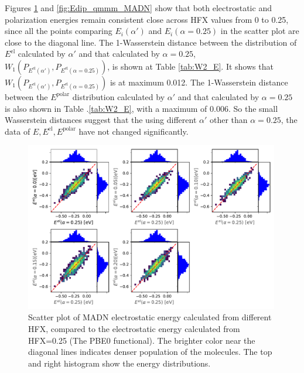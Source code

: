 \documentclass[letterpaper,12pt]{article}
\begin{document}
Figures \ref{fig:Estat_qmmm_MADN} and \ref{fig:Edip_qmmm_MADN} show that both electrostatic and polarization energies remain consistent close across HFX values from 0 to 0.25, since all the points comparing $E_i(\alpha')$ and $E_i(\alpha=0.25)$ in the scatter plot are close to the diagonal line.
The 1-Wasserstein distance between the distribution of $E^\text{el}$ calculated by $\alpha'$ and that calculated by $\alpha=0.25$, $W_1(P_{E^\text{el}(\alpha')}, P_{E^\text{el}(\alpha=0.25)})$, is shown at Table \ref{tab:W2_E}. It shows that $W_1(P_{E^\text{el}(\alpha')}, P_{E^\text{el}(\alpha=0.25)})$ is at maximum 0.012. The 1-Wasserstein distance between the $E^\text{polar}$ distribution calculated by $\alpha'$ and that calculated by $\alpha=0.25$ is also shown in Table .\ref{tab:W2_E}, with a maximum of 0.006. So the small Wasserstein distances suggest that the using different $\alpha'$ other than $\alpha=0.25$, the data of $E, E^\text{el}, E^\text{polar}$ have not changed significantly.

\begin{figure}[H]
    \centering
    \includegraphics[width=0.99\textwidth]{figs/scatterEstat_qmmm.pdf}
    \caption{Scatter plot of MADN electrostatic energy calculated from different HFX, compared to the electrostatic energy calculated from HFX=0.25 (The PBE0 functional). The brighter color near the diagonal lines indicates denser population of the molecules.  The top and right histogram show the energy distributions.}
    \label{fig:Estat_qmmm_MADN}
\end{figure}
\end{document}
